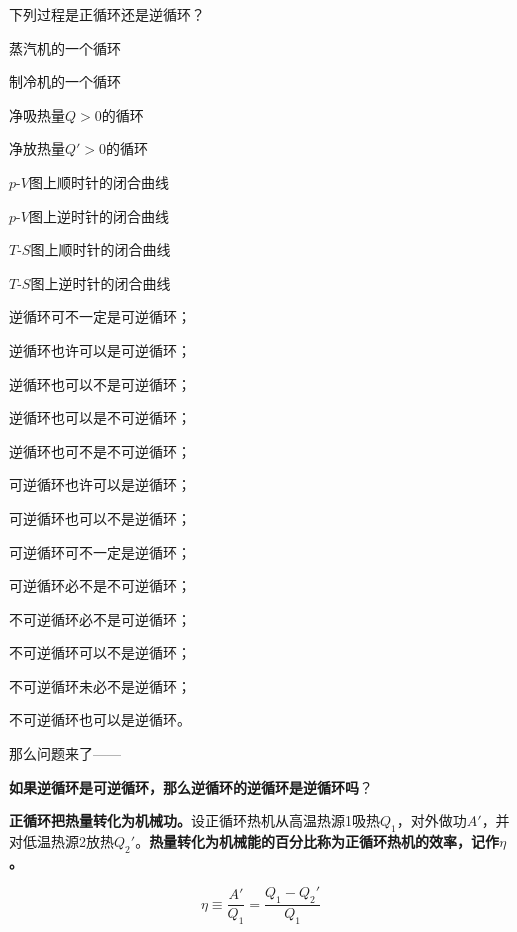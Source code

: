 \documentclass[CJK]{beamer}
\begin{document}
\begin{frame}
\bch
下列过程是正循环还是逆循环？
\bitem
\item{蒸汽机的一个循环}
\item{制冷机的一个循环}
\item{净吸热量$Q>0$的循环}
\item{净放热量$Q'>0$的循环}
\item{$p$-$V$图上顺时针的闭合曲线}
\item{$p$-$V$图上逆时针的闭合曲线}
\item{$T$-$S$图上顺时针的闭合曲线}
\item{$T$-$S$图上逆时针的闭合曲线}
\eitem
\ech
\end{frame}


\begin{frame}
\bch

逆循环可不一定是可逆循环；

逆循环也许可以是可逆循环；

逆循环也可以不是可逆循环；

逆循环也可以是不可逆循环；

逆循环也可不是不可逆循环；

可逆循环也许可以是逆循环；

可逆循环也可以不是逆循环；

可逆循环可不一定是逆循环；

可逆循环必不是不可逆循环；

不可逆循环必不是可逆循环；

不可逆循环可以不是逆循环；

不可逆循环未必不是逆循环；

不可逆循环也可以是逆循环。

那么问题来了——

{\bf 如果逆循环是可逆循环，那么逆循环的逆循环是逆循环吗}？
\ech
\end{frame}


\begin{frame}
\bch



{\bf 正循环把热量转化为机械功。}设正循环热机从高温热源1吸热$Q_1$，对外做功$A'$，并对低温热源2放热$Q_2'$。{\bf 热量转化为机械能的百分比称为正循环热机的效率，记作$\eta$。}

$$\eta \equiv \frac{A'}{Q_1}=\frac{Q_1-Q_2'}{Q_1} $$


\ech
\end{frame}
\end{document}
